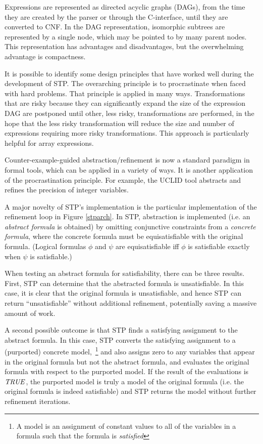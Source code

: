 Expressions are represented as directed acyclic graphs (DAGs), from
the time they are created by the parser or through the C-interface,
until they are converted to CNF.  In the DAG representation,
isomorphic subtrees are represented by a single node, which may be
pointed to by many parent nodes.  This representation has advantages
and disadvantages, but the overwhelming advantage is compactness.

It is possible to identify some design principles that have worked
well during the development of STP.  The overarching principle is to
procrastinate when faced with hard problems.  That principle is
applied in many ways. Transformations that are risky because they can
significantly expand the size of the expression DAG are postponed until
other, less risky, transformations are performed, in the hope that the
less risky transformation will reduce the size and number of
expressions requiring more risky transformations.  This approach is
particularly helpful for array expressions.

Counter-example-guided abstraction/refinement is now a standard
paradigm in formal tools, which can be applied in a variety of ways.
It is another application of the procrastination principle.
For example, the UCLID tool abstracts and refines the precision of
integer variables.

A major novelty of STP's implementation is the particular
implementation of the refinement loop in Figure \ref{stparch}.  In
STP, abstraction is implemented (i.e. an {\it abstract formula} is
obtained) by omitting conjunctive constraints from a {\em concrete
formula}, where the concrete formula must be equisatisfiable with the
original formula. (Logical formulas $\phi$ and $\psi$ are
equisatisfiable iff $\phi$ is satisfiable exactly when $\psi$ is
satisfiable.)
  
When testing an abstract formula for satisfiability, there can be
three results.  First, STP can determine that the abstracted formula
is unsatisfiable.  In this case, it is clear that the original formula
is unsatisfiable, and hence STP can return ``unsatisfiable'' without
additional refinement, potentially saving a massive amount of work.

A second possible outcome is that STP finds a satisfying assignment to
the abstract formula.  In this case, STP converts the satisfying
assignment to a (purported) concrete model,~\footnote{A model is an
assignment of constant values to all of the variables in a formula
such that the formula is {\it satisfied}} and also assigns zero to any
variables that appear in the original formula but not the abstract
formula, and evaluates the original formula with respect to the
purported model.  If the result of the evaluations is ${\it TRUE}$, the
purported model is truly a model of the original formula (i.e. the
original formula is indeed satisfiable) and STP returns the model
without further refinement iterations.

